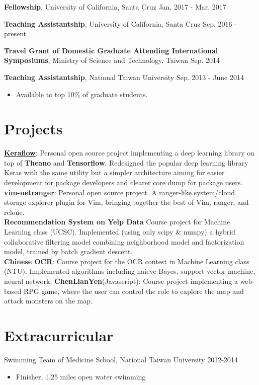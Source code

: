\documentclass[a4paper,10pt]{article}
\begin{document}
\textbf{Fellowship}, University of California, Santa Cruz \hfill Jan. 2017 - Mar. 2017

\textbf{Teaching Assistantship}, University of California, Santa Cruz \hfill Sep. 2016 - present

\textbf{Travel Grant of Domestic Graduate Attending International Symposiums}, Ministry of Science and Technology, Taiwan \hfill Sep. 2014

\textbf{Teaching Assistantship}, National Taiwan University \hfill Sep. 2013 - June 2014
\begin{itemize}
    \item Available to top 10\% of graduate students.
\end{itemize}


\section{Projects}
\href{https://github.com/ipod825/keraflow}{\textbf{Keraflow}}: Personal open source project implementing a deep learning library on top of \textbf{Theano} and \textbf{Tensorflow}. Redesigned the popular deep learning library Keras with the same utility but a simpler architecture aiming for easier development for package developers and clearer core dump for package users. \\
\href{https://github.com/ipod825/vim-netranger}{\textbf{vim-netranger}}: Personal open source project. A ranger-like system/cloud storage explorer plugin for Vim, bringing together the best of Vim, ranger, and rclone.  \\
\textbf{Recommendation System on Yelp Data} Course project for Machine Learning class (UCSC). Implemented (using only scipy \& numpy) a hybrid collaborative filtering model combining neighborhood model and factorization model, trained by batch gradient descent. \\
\textbf{Chinese OCR}: Course project for the OCR contest in Machine Learning class (NTU). Implemented algorithms including naieve Bayes, support vector machine, neural network.
\textbf{ChenLianYen}(Javascript): Course project implementing a web-based RPG game, where the user can control the role to explore the map and attack monsters on the map.


\section{Extracurricular}
Swimming Team of Medicine School, National Taiwan University \hfill 2012-2014
\begin{itemize}
    \item Finisher, 1.25 miles open water swimming
\end{itemize}
\end{document}
